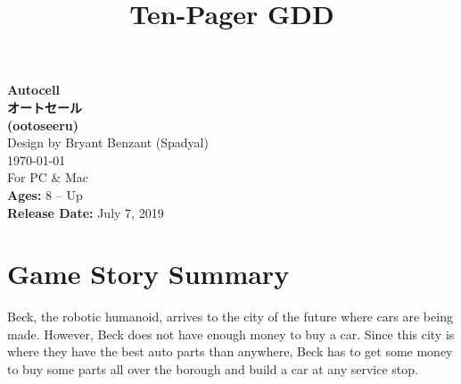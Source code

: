 \documentclass[12pt]{article}
\title{Ten-Pager GDD}
\begin{document}
\begin{CJK}{UTF8}{min}
	\begin{titlepage}
		\begin{center}
			\doublespacing
			\textbf{\Huge Autocell \\ オートセール} \\
			\textbf{\footnotesize (ootoseeru)} \\
			Design by Bryant Benzant (Spadyal) \\
			\mydate\today \\
			For PC \& Mac \\
			\textbf{Ages:} 8 -- Up \\
			\textbf{Release Date:} July 7, 2019
		\end{center}
	\end{titlepage}
	\section*{Game Story Summary}
	Beck, the robotic humanoid, arrives to the city of the future where cars are being made. However, Beck does not have enough money to buy a car. Since this city is where they have the best auto parts than anywhere, Beck has to get some money to buy some parts all over the borough and build a car at any service stop.


\end{CJK}
\end{document}
